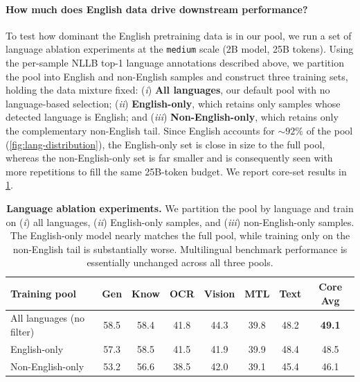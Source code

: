 \paragraph{How much does English data drive downstream performance?} To test how dominant the English pretraining data is in our pool, we run a set of language ablation experiments at the \texttt{medium} scale (2B model, 25B tokens). Using the per-sample NLLB top-1 language annotations described above, we partition the pool into English and non-English samples and construct three training sets, holding the data mixture fixed: (\textit{i}) \textbf{All languages}, our default pool with no language-based selection; (\textit{ii}) \textbf{English-only}, which retains only samples whose detected language is English; and (\textit{iii}) \textbf{Non-English-only}, which retains only the complementary non-English tail. Since English accounts for ${\sim}92\%$ of the pool (\cref{fig:lang-distribution}), the English-only set is close in size to the full pool, whereas the non-English-only set is far smaller and is consequently seen with more repetitions to fill the same 25B-token budget. We report core-set results in \cref{tab:lang-ablation}.

\begin{table}[h]
    \centering
    \caption{\textbf{Language ablation experiments.} We partition the \dcvlm{} pool by language and train on (\textit{i}) all languages, (\textit{ii}) English-only samples, and (\textit{iii}) non-English-only samples. The English-only model nearly matches the full pool, while training only on the non-English tail is substantially worse. Multilingual benchmark performance is essentially unchanged across all three pools.}
    \label{tab:lang-ablation}
    \small
    \begin{tabular}{lccccccc}
        \toprule
        \textbf{Training pool} & \textbf{Gen} & \textbf{Know} & \textbf{OCR} & \textbf{Vision} & \textbf{MTL} & \textbf{Text} & \textbf{Core Avg} \\
        \midrule
        All languages (no filter) & 58.5 & 58.4 & 41.8 & 44.3 & 39.8 & 48.2 & \textbf{49.1} \\
        English-only               & 57.3 & 58.5 & 41.5 & 41.9 & 39.9 & 48.4 & 48.5 \\
        Non-English-only           & 53.2 & 56.6 & 38.5 & 42.0 & 39.1 & 45.4 & 46.1 \\
        \bottomrule
    \end{tabular}
\end{table}

